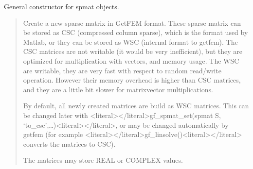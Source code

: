 \documentclass[a4paper,11pt,english]{sphinxmanual}
\begin{document}
\sphinxAtStartPar
General constructor for spmat objects.
\begin{quote}

\sphinxAtStartPar
Create a new sparse matrix in GetFEM format. These sparse matrix can be stored as CSC (compressed column
sparse), which is the format used by Matlab, or they can be stored as WSC
(internal format to getfem). The CSC matrices are not writable (it would
be very inefficient), but they are optimized for multiplication with
vectors, and memory usage. The WSC are writable, they are very fast with
respect to random read/write operation. However their memory overhead is
higher than CSC matrices, and they are a little bit slower for
matrix\sphinxhyphen{}vector multiplications.

\sphinxAtStartPar
By default, all newly created matrices are build as WSC matrices. This can
be changed later with \textless{}literal\textgreater{}\textless{}/literal\textgreater{}gf\_spmat\_set(spmat S, ‘to\_csc’,…)\textless{}literal\textgreater{}\textless{}/literal\textgreater{}, or may be changed
automatically by getfem (for example \textless{}literal\textgreater{}\textless{}/literal\textgreater{}gf\_linsolve()\textless{}literal\textgreater{}\textless{}/literal\textgreater{} converts the
matrices to CSC).

\sphinxAtStartPar
The matrices may store REAL or COMPLEX values.
\end{quote}
\end{document}
